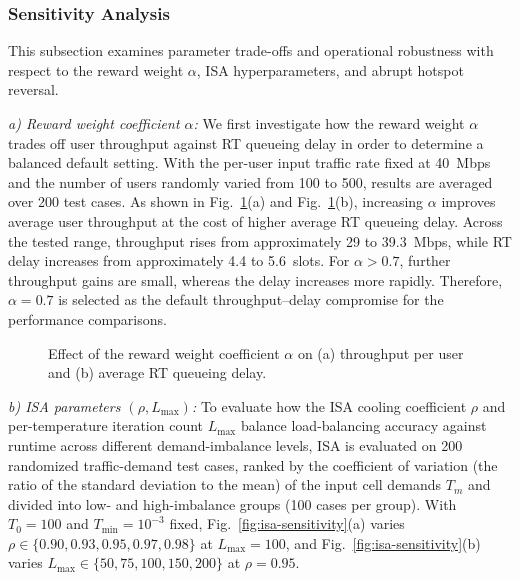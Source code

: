 \documentclass[journal]{IEEEtran}
\begin{document}
\begin{table}[!t]
\centering
\caption{Ablation Results at Different Per-User Input Rates}
\label{tab:ablation-performance}

\end{table}

\subsubsection{Sensitivity Analysis}
This subsection examines parameter trade-offs and operational robustness with respect to the reward weight $\alpha$, ISA hyperparameters, and abrupt hotspot reversal.

\textit{a) Reward weight coefficient $\alpha$:}
We first investigate how the reward weight $\alpha$ trades off user throughput against RT queueing delay in order to determine a balanced default setting. With the per-user input traffic rate fixed at 40~Mbps and the number of users randomly varied from 100 to 500, results are averaged over 200 test cases. As shown in Fig.~\ref{fig:alpha-performance}(a) and Fig.~\ref{fig:alpha-performance}(b), increasing $\alpha$ improves average user throughput at the cost of higher average RT queueing delay. Across the tested range, throughput rises from approximately 29 to 39.3~Mbps, while RT delay increases from approximately 4.4 to 5.6~slots. For $\alpha>0.7$, further throughput gains are small, whereas the delay increases more rapidly. Therefore, $\alpha=0.7$ is selected as the default throughput--delay compromise for the performance comparisons.

\begin{figure}[!t]
\centering

\caption{Effect of the reward weight coefficient $\alpha$ on (a) throughput per user and (b) average RT queueing delay.}
\label{fig:alpha-performance}
\end{figure}

\textit{b) ISA parameters $(\rho, L_{\max})$:}
To evaluate how the ISA cooling coefficient $\rho$ and per-temperature iteration count $L_{\max}$ balance load-balancing accuracy against runtime across different demand-imbalance levels, ISA is evaluated on 200 randomized traffic-demand test cases, ranked by the coefficient of variation (the ratio of the standard deviation to the mean) of the input cell demands $T_m$ and divided into low- and high-imbalance groups (100 cases per group). With~$T_0=100$ and $T_{\min}=10^{-3}$ fixed, Fig.~\ref{fig:isa-sensitivity}(a) varies $\rho\in\{0.90,0.93,0.95,0.97,0.98\}$ at $L_{\max}=100$, and Fig.~\ref{fig:isa-sensitivity}(b) varies $L_{\max}\in\{50,75,100,150,200\}$ at $\rho=0.95$.
\end{document}
